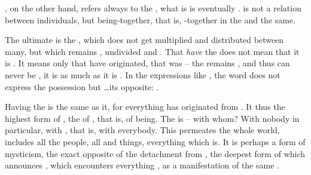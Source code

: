 , on the other hand, refers always to the , what is  is eventually  .
 is not a relation between individuals, but being-together, that is,
-together in the  and the same. 


\pa\label{pa:originShares} \inv The ultimate  is  the
, which does not get multiplied and distributed between many, but
which remains , undivided and .  That  {\em
  have} the  does not mean that it is . It means only that
 have originated, that  was  -- the  remains
, and thus can never be , it is  as much as it is
. In the expressions like , the word
 does not express the possession but \ldots its opposite:
.

Having the  is the same as  it, for everything has
originated from . It thus  the highest form of
, the  of , that is, of being.
The  is  -- with whom?  With nobody in particular, with
, that is, with everybody.  This  permeates the whole
world, includes all the people, all  and  things,
everything which is.  It is perhaps a form of mysticism, the exact opposite of
the {detachment} from , the deepest form of  which
announces , which encounters everything , as a manifestation of the same .

